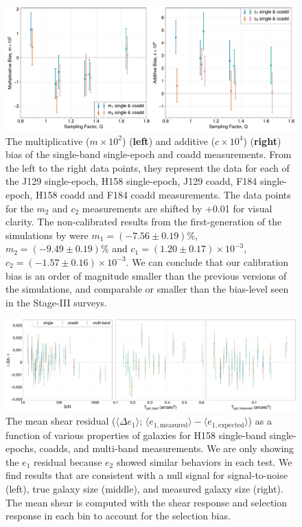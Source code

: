 \documentclass[fleqn,usenatbib]{mnras}
\begin{document}
\begin{figure}
	\includegraphics[width=\textwidth]{final_result_v4_pplt.pdf}
    \caption{The multiplicative ($m \times 10^2$) (\textbf{left}) and additive ($c \times 10^4$) (\textbf{right}) bias of the single-band single-epoch and coadd measurements. From the left to the right data points, they represent the data for each of the J129 single-epoch, H158 single-epoch, J129 coadd, F184 single-epoch, H158 coadd and F184 coadd measurements. The data points for the $m_2$ and $c_2$ measurements are shifted by +0.01 for visual clarity. The non-calibrated results from the first-generation of the simulations by \cite{2021MNRAS.501.2044T} were $m_1=(-7.56\pm0.19)\%$, $m_2=(-9.49\pm0.19)\%$ and $c_1=(1.20\pm0.17)\times10^{-3}$, $c_2=(-1.57\pm0.16)\times10^{-3}$. We can conclude that our calibration bias is an order of magnitude smaller than the previous versions of the simulations, and comparable or smaller than the bias-level seen in the Stage-III surveys.}
    \label{fig:final_result}
\end{figure}

\begin{figure}
    \centering
	\includegraphics[width=\textwidth]{H158_meanshear_measured_properties_perbin_e1_v6_pplt.pdf}
    \caption{The mean shear residual ($\langle \Delta e_{1} \rangle$; $\langle e_{1,\text{measured}} \rangle - \langle e_{1,\text{expected}} \rangle$) as a function of various properties of galaxies for H158 single-band single-epochs, coadds, and multi-band measurements. We are only showing the $e_1$ residual because $e_{2}$ showed similar behaviors in each test. We find results that are consistent with a null signal for signal-to-noise (left), true galaxy size (middle), and measured galaxy size (right). The mean shear is computed with the shear response and selection response in each bin to account for the selection bias.}
    \label{fig:meanshear}
\end{figure}
\end{document}
